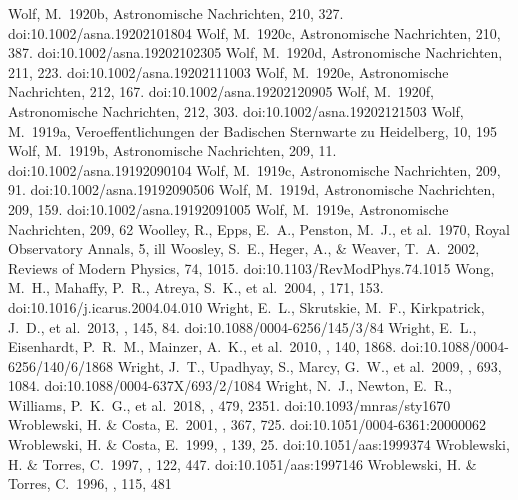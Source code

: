 \documentclass[twocolumn,tighten,twocolappendix]{aastex631}
\begin{document}
\begin{thebibliography}{}
 Wolf, M.\ 1920b, Astronomische Nachrichten, 210, 327. doi:10.1002/asna.19202101804
 Wolf, M.\ 1920c, Astronomische Nachrichten, 210, 387. doi:10.1002/asna.19202102305
 Wolf, M.\ 1920d, Astronomische Nachrichten, 211, 223. doi:10.1002/asna.19202111003
 Wolf, M.\ 1920e, Astronomische Nachrichten, 212, 167. doi:10.1002/asna.19202120905
 Wolf, M.\ 1920f, Astronomische Nachrichten, 212, 303. doi:10.1002/asna.19202121503
 Wolf, M.\ 1919a, Veroeffentlichungen der Badischen Sternwarte zu Heidelberg, 10, 195
 Wolf, M.\ 1919b, Astronomische Nachrichten, 209, 11. doi:10.1002/asna.19192090104
 Wolf, M.\ 1919c, Astronomische Nachrichten, 209, 91. doi:10.1002/asna.19192090506
 Wolf, M.\ 1919d, Astronomische Nachrichten, 209, 159. doi:10.1002/asna.19192091005
 Wolf, M.\ 1919e, Astronomische Nachrichten, 209, 62
 Woolley, R., Epps, E.~A., Penston, M.~J., et al.\ 1970, Royal Observatory Annals, 5, ill
 Woosley, S.~E., Heger, A., \& Weaver, T.~A.\ 2002, Reviews of Modern Physics, 74, 1015. doi:10.1103/RevModPhys.74.1015
 Wong, M.~H., Mahaffy, P.~R., Atreya, S.~K., et al.\ 2004, \icarus, 171, 153. doi:10.1016/j.icarus.2004.04.010
 Wright, E.~L., Skrutskie, M.~F., Kirkpatrick, J.~D., et al.\ 2013, \aj, 145, 84. doi:10.1088/0004-6256/145/3/84
 Wright, E.~L., Eisenhardt, P.~R.~M., Mainzer, A.~K., et al.\ 2010, \aj, 140, 1868. doi:10.1088/0004-6256/140/6/1868
 Wright, J.~T., Upadhyay, S., Marcy, G.~W., et al.\ 2009, \apj, 693, 1084. doi:10.1088/0004-637X/693/2/1084
 Wright, N.~J., Newton, E.~R., Williams, P.~K.~G., et al.\ 2018, \mnras, 479, 2351. doi:10.1093/mnras/sty1670
 Wroblewski, H. \& Costa, E.\ 2001, \aap, 367, 725. doi:10.1051/0004-6361:20000062
 Wroblewski, H. \& Costa, E.\ 1999, \aaps, 139, 25. doi:10.1051/aas:1999374
 Wroblewski, H. \& Torres, C.\ 1997, \aaps, 122, 447. doi:10.1051/aas:1997146
 Wroblewski, H. \& Torres, C.\ 1996, \aaps, 115, 481

\end{thebibliography}
\end{document}
